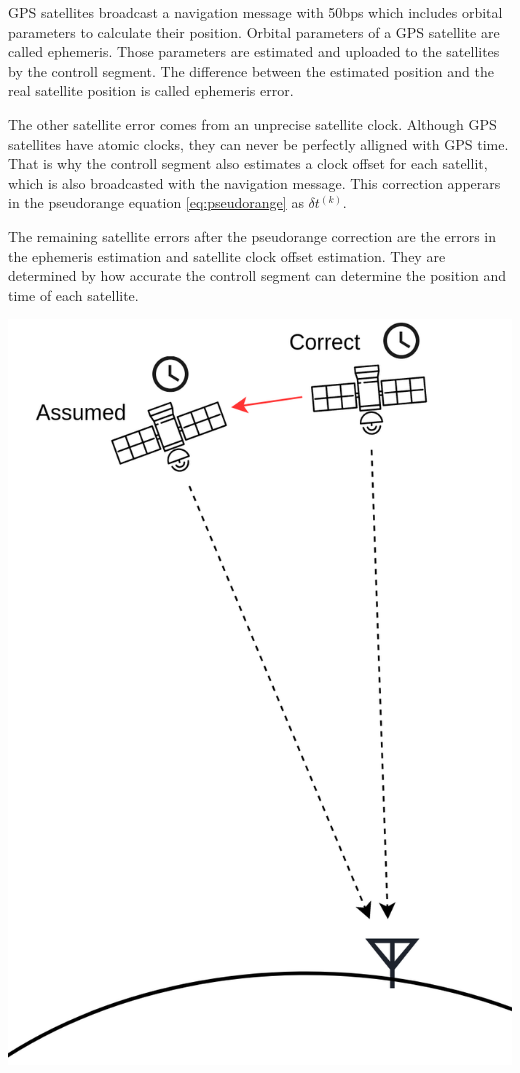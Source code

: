 \begin{minipage}{0.6\textwidth}
  GPS satellites broadcast a navigation message with 50bps which includes orbital parameters to calculate their position.
  Orbital parameters of a GPS satellite are called ephemeris. 
  Those parameters are estimated and uploaded to the satellites by the controll segment.
  The difference between the estimated position and the real satellite position is called ephemeris error.
  
  The other satellite error comes from an unprecise satellite clock.
  Although GPS satellites have atomic clocks, they can never be perfectly alligned with GPS time.
  That is why the controll segment also estimates a clock offset for each satellit, which is also broadcasted with the navigation message.
  This correction apperars in the pseudorange equation \ref{eq:pseudorange} as $\delta t^{(k)}$.
  
  The remaining satellite errors after the pseudorange correction are the errors in the ephemeris estimation and satellite clock offset estimation.
  They are determined by how accurate the controll segment can determine the position and time of each satellite.
\end{minipage}
\hfill
\begin{minipage}{0.38\textwidth}
 \flushright
 \includegraphics[width=\textwidth]{images/Satellite_Errors.png}
\end{minipage}

